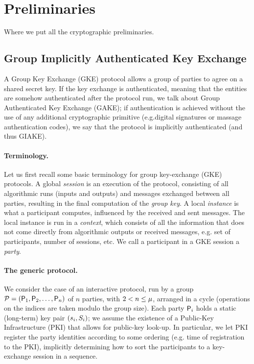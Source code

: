 \section{Preliminaries}\label{sec:preliminaries}
Where we put all the cryptographic preliminaries.

\subsection{Group Implicitly Authenticated Key Exchange}\label{subsec:GIAKE}
A Group Key Exchange (GKE) protocol allows a group of parties to agree on a shared secret key. 
If the key exchange is authenticated, meaning that the entities are somehow authenticated after the protocol run, we talk about Group Authenticated Key Exchange (GAKE); if authentication is achieved without the use of any additional cryptographic primitive (e.g.digital signatures or massage authentication codes), we say that the protocol is implicitly authenticated (and thus GIAKE).

\paragraph{Terminology.} Let us first recall some basic terminology for group key-exchange (GKE) protocols.
A global \textit{session} is an execution of the protocol, consisting of all algorithmic runs (inputs and outputs) and messages exchanged between all parties, resulting in the final computation of the \textit{group key}.
A local \textit{instance} is what a participant computes, influenced by the received and sent messages.
The local instance is run in a \textit{context}, which consists of all the information that does not come directly from algorithmic outputs or received messages, e.g. set of participants, number of sessions, etc.
We call a participant in a GKE session a \textit{party}.

\paragraph{The generic protocol.} We consider the case of an interactive protocol, run by a group $\PartySet = (\Party_1,\allowbreak \Party_2,\dots,\Party_n)$ of $n$ parties, with $2 < n \leq \projectKey$, arranged in a cycle (operations on the indices are taken modulo the group size).
Each party $\User[i]$ holds a static (long-term) key pair $(\ssk_i,\spk_i)$; we assume the existence of a Public-Key Infrastructure (PKI) that allows for public-key look-up.
In particular, we let PKI register the party identities according to some ordering (e.g. time of registration to the PKI), implicitly determining how to sort the participants to a key-exchange session in a sequence.

